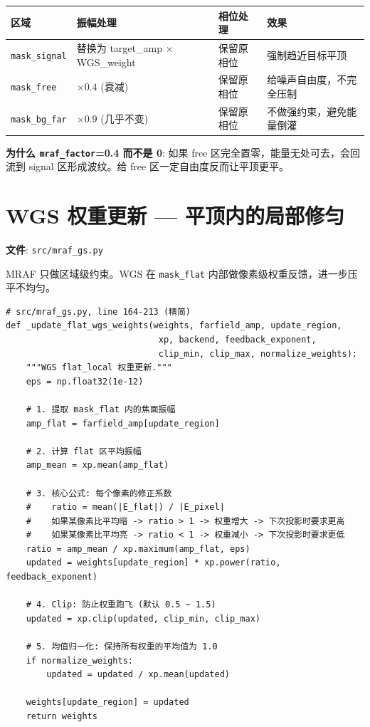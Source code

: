 \documentclass[11pt,a4paper]{ctexart}
\begin{document}
\begin{center}
\begin{tabular}{p{}p{}p{}p{}}
\toprule
\textbf{区域} & \textbf{振幅处理} & \textbf{相位处理} & \textbf{效果} \\
\midrule
\texttt{mask\_signal} & 替换为 target\_amp $\times$ WGS\_weight & 保留原相位 & 强制趋近目标平顶 \\
\texttt{mask\_free}   & $\times 0.4$ (衰减) & 保留原相位 & 给噪声自由度，不完全压制 \\
\texttt{mask\_bg\_far} & $\times 0.9$ (几乎不变) & 保留原相位 & 不做强约束，避免能量倒灌 \\
\bottomrule
\end{tabular}
\end{center}

\textbf{为什么 \texttt{mraf\_factor}=0.4 而不是 0}: 如果 free 区完全置零，能量无处可去，会回流到 signal 区形成波纹。给 free 区一定自由度反而让平顶更平。

\section{WGS 权重更新 — 平顶内的局部修匀}

\textbf{文件}: \texttt{src/mraf\_gs.py}

MRAF 只做区域级约束。WGS 在 \texttt{mask\_flat} 内部做像素级权重反馈，进一步压平不均匀。

\begin{lstlisting}
# src/mraf_gs.py, line 164-213 (精简)
def _update_flat_wgs_weights(weights, farfield_amp, update_region,
                              xp, backend, feedback_exponent,
                              clip_min, clip_max, normalize_weights):
    """WGS flat_local 权重更新."""
    eps = np.float32(1e-12)

    # 1. 提取 mask_flat 内的焦面振幅
    amp_flat = farfield_amp[update_region]

    # 2. 计算 flat 区平均振幅
    amp_mean = xp.mean(amp_flat)

    # 3. 核心公式: 每个像素的修正系数
    #    ratio = mean(|E_flat|) / |E_pixel|
    #    如果某像素比平均暗 -> ratio > 1 -> 权重增大 -> 下次投影时要求更高
    #    如果某像素比平均亮 -> ratio < 1 -> 权重减小 -> 下次投影时要求更低
    ratio = amp_mean / xp.maximum(amp_flat, eps)
    updated = weights[update_region] * xp.power(ratio, feedback_exponent)

    # 4. Clip: 防止权重跑飞 (默认 0.5 ~ 1.5)
    updated = xp.clip(updated, clip_min, clip_max)

    # 5. 均值归一化: 保持所有权重的平均值为 1.0
    if normalize_weights:
        updated = updated / xp.mean(updated)

    weights[update_region] = updated
    return weights
\end{lstlisting}
\end{document}
